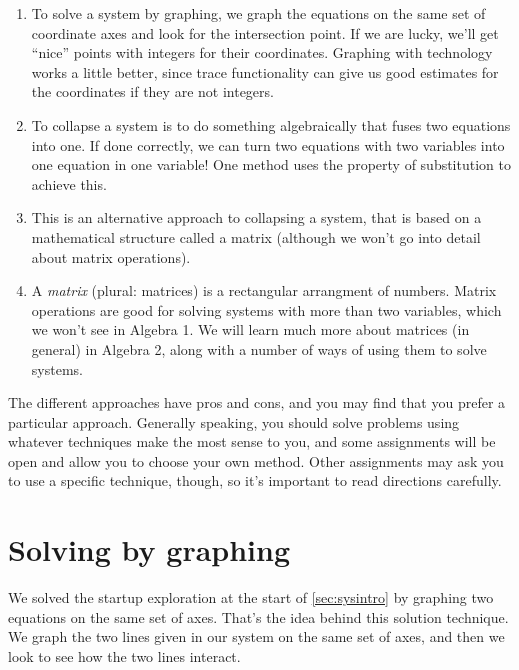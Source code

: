 \begin{enumerate}
\item {} To solve a system by graphing, we graph the equations on the same set of coordinate axes and look for the intersection point. If we are lucky, we'll get ``nice'' points with integers for their coordinates. Graphing with technology works a little better, since trace functionality can give us good estimates for the coordinates if they are not integers.

\item {} To collapse a system is to do something algebraically that fuses two equations into one. If done correctly, we can turn two equations with two variables into one equation in one variable! One method uses the property of substitution to achieve this.

\item {} This is an alternative approach to collapsing a system, that is based on a mathematical structure called a matrix (although we won't go into detail about matrix operations).

\item {} A \textit{matrix} (plural: matrices) is a rectangular arrangment of numbers. Matrix operations are good for solving systems with more than two variables, which we won't see in Algebra 1. We will learn much more about matrices (in general) in Algebra 2, along with a number of ways of using them to solve systems.
\end{enumerate}

The different approaches have pros and cons, and you may find that you prefer a particular approach. Generally speaking, you should solve problems using whatever techniques make the most sense to you, and some assignments will be open and allow you to choose your own method. Other assignments may ask you to use a specific technique, though, so it's important to read directions carefully.

\section{Solving by graphing}
\label{sec:sysgraphing}

We solved the startup exploration at the start of \cref{sec:sysintro} by graphing two equations on the same set of axes. That's the idea behind this solution technique. We graph the two lines given in our system on the same set of axes, and then we look to see how the two lines interact.

